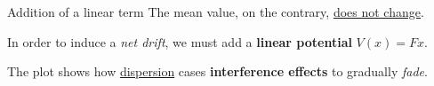 \begin{frame}{Addition of a linear term}
    The mean value, on the contrary, \underline{does not change}.

    \vfill

    \pause

    In order to induce a \textit{net drift}, we must add a \textbf{linear potential} $V(x)=Fx$.

    \vfill

    \vspace{-0.1cm}


    \vspace{-0.5cm}

    \footnotesize

    \begin{center}
        The plot shows how \underline{dispersion} cases \textbf{interference effects} to gradually \textit{fade}.
    \end{center}

    \normalsize
\end{frame}

